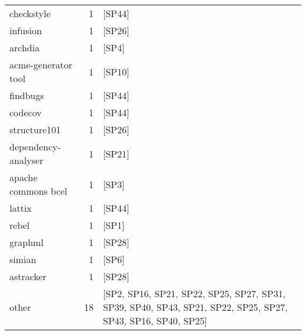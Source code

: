 \begin{tabular}{lrl}
          checkstyle &      1 &                                                                                                       [SP44] \\
            infusion &      1 &                                                                                                       [SP26] \\
             archdia &      1 &                                                                                                        [SP4] \\
 acme-generator tool &      1 &                                                                                                       [SP10] \\
            findbugs &      1 &                                                                                                       [SP44] \\
             codecov &      1 &                                                                                                       [SP44] \\
        structure101 &      1 &                                                                                                       [SP26] \\
 dependency-analyser &      1 &                                                                                                       [SP21] \\
 apache commons bcel &      1 &                                                                                                        [SP3] \\
              lattix &      1 &                                                                                                       [SP44] \\
               rebel &      1 &                                                                                                        [SP1] \\
             graphml &      1 &                                                                                                       [SP28] \\
              simian &      1 &                                                                                                        [SP6] \\
           astracker &      1 &                                                                                                       [SP28] \\
               other &     18 &  [SP2, SP16, SP21, SP22, SP25, SP27, SP31, SP39, SP40, SP43, SP21, SP22, SP25, SP27, SP43, SP16, SP40, SP25] \\
\bottomrule
\end{tabular}
